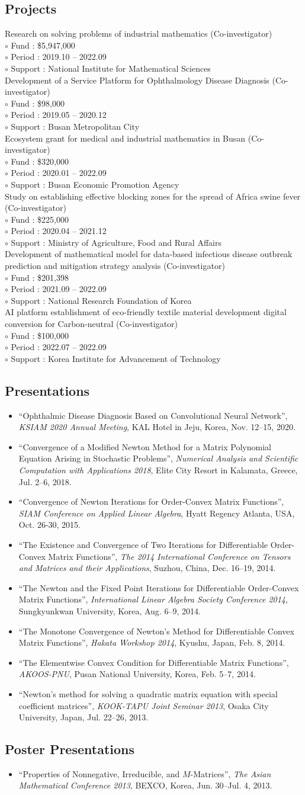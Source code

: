 \documentclass[11pt]{article} %
\newcommand\mypapers{
	
}
\newcommand\myprojseng{
	Research on solving problems of industrial mathematics (Co-investigator) \\
	$\circ$ Fund : \$5,947,000 \\
	$\circ$ Period : 2019.10 -- 2022.09 \\
	$\circ$ Support : National Institute for Mathematical Sciences \\
	
	Development of a Service Platform for Ophthalmology Disease Diagnosis (Co-investigator) \\
	$\circ$ Fund : \$98,000 \\
	$\circ$ Period : 2019.05 -- 2020.12 \\
	$\circ$ Support : Busan Metropolitan City \\
	
	Ecosystem grant for medical and industrial mathematics in Busan (Co-investigator) \\
	$\circ$ Fund : \$320,000 \\
	$\circ$ Period : 2020.01 -- 2022.09 \\
	$\circ$ Support : Busan Economic Promotion Agency \\
	
	Study on establishing effective blocking zones for the spread of Africa swine fever (Co-investigator) \\
	$\circ$ Fund : \$225,000 \\
	$\circ$ Period : 2020.04 -- 2021.12 \\
	$\circ$ Support : Ministry of Agriculture, Food and Rural Affairs \\
	
	Development of mathematical model for data-based infectious disease outbreak prediction and mitigation strategy analysis (Co-investigator) \\
	$\circ$ Fund : \$201,398 \\
	$\circ$ Period : 2021.09 -- 2022.09 \\
	$\circ$ Support : National Research Foundation of Korea \\
	
	AI platform establishment of eco-friendly textile material development digital conversion for Carbon-neutral (Co-investigator) \\
	$\circ$ Fund : \$100,000 \\
	$\circ$ Period : 2022.07 -- 2022.09 \\
	$\circ$ Support : Korea Institute for Advancement of Technology
}
\newcommand\mypresent{
	\begin{itemize}[leftmargin=*]
		\item ``Ophthalmic Disease Diagnosis Based on Convolutional Neural Network'', {\it KSIAM 2020 Annual Meeting}, KAL Hotel in Jeju, Korea, Nov. 12--15, 2020.
		\item ``Convergence of a Modified Newton Method for a Matrix Polynomial Equation Arising in Stochastic Problems'', {\it Numerical Analysis and Scientific Computation with Applications 2018}, Elite City Resort in Kalamata, Greece, Jul. 2--6, 2018.
		\item ``Convergence of Newton Iterations for Order-Convex Matrix Functions'', {\it SIAM Conference on Applied Linear Algebra}, Hyatt Regency Atlanta, USA, Oct. 26-30, 2015.
		\item ``The Existence and Convergence of Two Iterations for Differentiable Order-Convex Matrix Functions'', {\it The 2014 International Conference on Tensors and Matrices and their Applications}, Suzhou, China, Dec. 16--19, 2014.
		\item ``The Newton and the Fixed Point Iterations for Differentiable Order-Convex Matrix Functions'', {\it International Linear Algebra Society Conference 2014}, Sungkyunkwan University, Korea, Aug. 6--9, 2014.
		\item ``The Monotone Convergence of Newton’s Method for Differentiable Convex Matrix Functions'', {\it Hakata Workshop 2014}, Kyushu, Japan, Feb. 8, 2014.
		\item ``The Elementwise Convex Condition for Differentiable Matrix Functions'', {\it AKOOS-PNU}, Pusan National University, Korea, Feb. 5--7, 2014.
		\item ``Newton’s method for solving a quadratic matrix equation with special coefficient matrices'', {\it KOOK-TAPU Joint Seminar 2013}, Osaka City University, Japan, Jul. 22--26, 2013.
		
	\end{itemize}
}
\newcommand\myposter{
	\begin{itemize}[leftmargin=*]
		\item ``Properties of Nonnegative, Irreducible, and $M$-Matrices'', {\it The Asian Mathematical Conference 2013}, BEXCO, Korea, Jun. 30--Jul. 4, 2013.
	\end{itemize}
}
\begin{document}
\mypapers


\subsection*{Projects}
\myprojseng


\subsection*{Presentations}
\renewcommand\labelitemi{\tiny$\bullet$}
\mypresent

\subsection*{Poster Presentations}
\myposter


%
%
%
%
%
%
%
\fi
\end{document}
